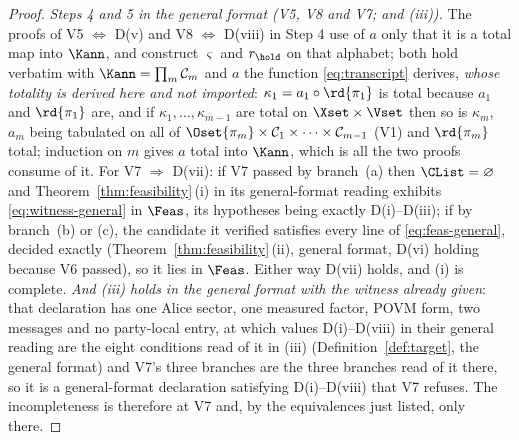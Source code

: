 \begin{proof}
\emph{Steps 4 and 5 in the general format (V5, V8 and V7; and (iii)).} The
proofs of V5 $\Leftrightarrow$ D(v) and V8 $\Leftrightarrow$ D(viii) in
Step 4 use of $a$ only that it is a total map into $\Kann$, and construct
$\varsigma$ and $r_{\hold}$ on that alphabet; both hold verbatim with
$\Kann=\prod_m\mathcal{C}_m$ and $a$ the function \eqref{eq:transcript}
derives, \emph{whose totality is derived here and not imported}:
$\kappa_1=a_1\circ\rd{\pi_1}$ is total because $a_1$ and $\rd{\pi_1}$ are, and
if $\kappa_1,\dots,\kappa_{m-1}$ are total on $\Xset\times\Vset$ then so is
$\kappa_m$, $a_m$ being tabulated on all of
$\Oset{\pi_m}\times\mathcal{C}_1\times\dots\times\mathcal{C}_{m-1}$ (V1) and
$\rd{\pi_m}$ total; induction on $m$ gives $a$ total into $\Kann$, which is
all the two proofs consume of it. For V7 $\Rightarrow$ D(vii): if V7 passed by
branch~(a) then $\CList=\varnothing$ and Theorem~\ref{thm:feasibility}\,(i) in its
general-format reading exhibits \eqref{eq:witness-general} in $\Feas$, its
hypotheses being exactly D(i)--D(iii); if by branch~(b) or (c), the candidate
it verified satisfies every line of \eqref{eq:feas-general}, decided exactly
(Theorem~\ref{thm:feasibility}\,(ii), general format, D(vi) holding because
V6 passed), so it lies in $\Feas$. Either
way D(vii) holds, and (i) is complete. \emph{And (iii) holds in the general
format with the witness already given}: that declaration has one Alice sector,
one measured factor, POVM form, two messages and no party-local entry, at which
values D(i)--D(viii) in their general reading are the eight conditions read of
it in (iii) (Definition~\ref{def:target}, the general format) and V7's three
branches are the three branches read of it there, so it is a general-format
declaration satisfying D(i)--D(viii) that V7 refuses. The incompleteness is
therefore at V7 and, by the equivalences just listed, only there.


\end{proof}
